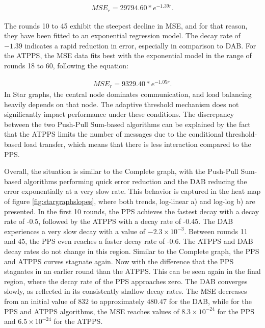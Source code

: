\begin{align}
    MSE_r=29794.60*e^{-1.39r}.    
\end{align}

The rounds 10 to 45 exhibit the steepest decline in MSE, and for that reason, they have been fitted to an exponential regression model. The decay rate of $-1.39$ indicates a rapid reduction in error, especially in comparison to DAB. For the ATPPS, the MSE data fits best with the exponential model in the range of rounds 18 to 60, following the equation:

\begin{align}
    MSE_r=9329.40*e^{-1.05r}.    
\end{align}
In Star graphs, the central node dominates communication, and load balancing heavily depends on that node. The adaptive threshold mechanism does not significantly impact performance under these conditions. The discrepancy between the two Push-Pull Sum-based algorithms can be explained by the fact that the ATPPS limits the number of messages due to the conditional threshold-based load transfer, which means that there is less interaction compared to the PPS.

Overall, the situation is similar to the Complete graph, with the Push-Pull Sum-based algorithms performing quick error reduction and the DAB reducing the error exponentially at a very slow rate. This behavior is captured in the heat map of figure \ref{fig:stargraphslopes}, where both trends, log-linear a) and log-log b) are presented. In the first 10 rounds, the PPS achieves the fastest decay with a decay rate of -0.5, followed by the ATPPS with a decay rate of -0.45. The DAB experiences a very slow decay with a value of $-2.3 \times 10^{-3}$. Between rounds 11 and 45, the PPS even reaches a faster decay rate of -0.6. The ATPPS and DAB decay rates do not change in this region. Similar to the Complete graph, the PPS and ATPPS curves stagnate again. Now with the difference that the PPS stagnates in an earlier round than the ATPPS. This can be seen again in the final region, where the decay rate of the PPS approaches zero. The DAB converges slowly, as reflected in its consistently shallow decay rates. The MSE decreases from an initial value of $832$ to approximately $480.47$ for the DAB, while for the PPS and ATPPS algorithms, the MSE reaches values of $8.3\times 10^{-24}$ for the PPS and $6.5 \times 10^{-24}$ for the ATPPS.

